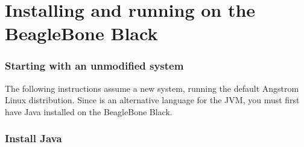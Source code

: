 \chapter{Installing and running on the BeagleBone Black}
\subsection{Starting with an unmodified system}
The following instructions assume a new system, running the default Angstrom  Linux distribution.
Since \nr{} is an alternative language for the JVM, you must first have Java installed on the BeagleBone Black.
\subsection{Install Java}
